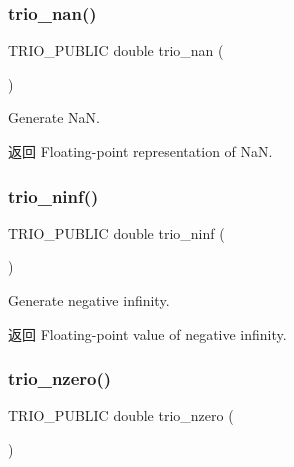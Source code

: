 \subsubsection{\texorpdfstring{trio\+\_\+nan()}{trio\_nan()}}
{\footnotesize\ttfamily T\+R\+I\+O\+\_\+\+P\+U\+B\+L\+IC double trio\+\_\+nan (\begin{DoxyParamCaption}\item[{T\+R\+I\+O\+\_\+\+N\+O\+A\+R\+GS}]{ }\end{DoxyParamCaption})}

Generate NaN.

\begin{DoxyReturn}{返回}
Floating-\/point representation of NaN. 
\end{DoxyReturn}
\mbox{\label{group___special_quantities_ga59b7b052ec7461d44e05e5aaf36197f4}} 
\subsubsection{\texorpdfstring{trio\+\_\+ninf()}{trio\_ninf()}}
{\footnotesize\ttfamily T\+R\+I\+O\+\_\+\+P\+U\+B\+L\+IC double trio\+\_\+ninf (\begin{DoxyParamCaption}\item[{T\+R\+I\+O\+\_\+\+N\+O\+A\+R\+GS}]{ }\end{DoxyParamCaption})}

Generate negative infinity.

\begin{DoxyReturn}{返回}
Floating-\/point value of negative infinity. 
\end{DoxyReturn}
\mbox{\label{group___special_quantities_ga2297b57060a605b6b0809a04a8d074c7}} 
\subsubsection{\texorpdfstring{trio\+\_\+nzero()}{trio\_nzero()}}
{\footnotesize\ttfamily T\+R\+I\+O\+\_\+\+P\+U\+B\+L\+IC double trio\+\_\+nzero (\begin{DoxyParamCaption}\item[{T\+R\+I\+O\+\_\+\+N\+O\+A\+R\+GS}]{ }\end{DoxyParamCaption})}

